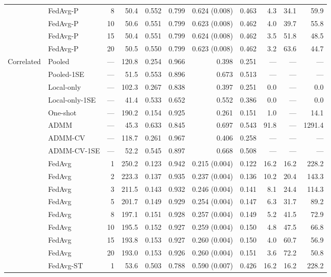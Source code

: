 \begin{longtable}{llrrrrrrrrr}
 & FedAvg-P & 8 & 50.4 & 0.552 & 0.799 & 0.624 (0.008) & 0.463 & 4.3 & 34.1 & 59.9 \\
 & FedAvg-P & 10 & 50.6 & 0.551 & 0.799 & 0.623 (0.008) & 0.462 & 4.0 & 39.7 & 55.8 \\
 & FedAvg-P & 15 & 50.4 & 0.551 & 0.799 & 0.624 (0.008) & 0.462 & 3.5 & 51.8 & 48.5 \\
 & FedAvg-P & 20 & 50.5 & 0.550 & 0.799 & 0.623 (0.008) & 0.462 & 3.2 & 63.6 & 44.7 \\
\midrule
Correlated & Pooled & --- & 120.8 & 0.254 & 0.966 & 0.398 & 0.251 & --- & --- & --- \\
 & Pooled-1SE & --- & 51.5 & 0.553 & 0.896 & 0.673 & 0.513 & --- & --- & --- \\
 & Local-only & --- & 102.3 & 0.267 & 0.838 & 0.397 & 0.251 & 0.0 & --- & 0.0 \\
 & Local-only-1SE & --- & 41.4 & 0.533 & 0.652 & 0.552 & 0.386 & 0.0 & --- & 0.0 \\
 & One-shot & --- & 190.2 & 0.154 & 0.925 & 0.261 & 0.151 & 1.0 & --- & 14.1 \\
 & ADMM & --- & 45.3 & 0.633 & 0.845 & 0.697 & 0.543 & 91.8 & --- & 1291.4 \\
 & ADMM-CV & --- & 118.7 & 0.261 & 0.967 & 0.406 & 0.258 & --- & --- & --- \\
 & ADMM-CV-1SE & --- & 52.2 & 0.545 & 0.897 & 0.668 & 0.508 & --- & --- & --- \\
 & FedAvg & 1 & 250.2 & 0.123 & 0.942 & 0.215 (0.004) & 0.122 & 16.2 & 16.2 & 228.2 \\
 & FedAvg & 2 & 223.3 & 0.137 & 0.935 & 0.237 (0.004) & 0.136 & 10.2 & 20.4 & 143.3 \\
 & FedAvg & 3 & 211.5 & 0.143 & 0.932 & 0.246 (0.004) & 0.141 & 8.1 & 24.4 & 114.3 \\
 & FedAvg & 5 & 201.7 & 0.149 & 0.929 & 0.254 (0.004) & 0.147 & 6.3 & 31.7 & 89.2 \\
 & FedAvg & 8 & 197.1 & 0.151 & 0.928 & 0.257 (0.004) & 0.149 & 5.2 & 41.5 & 72.9 \\
 & FedAvg & 10 & 195.5 & 0.152 & 0.927 & 0.259 (0.004) & 0.150 & 4.8 & 47.5 & 66.8 \\
 & FedAvg & 15 & 193.8 & 0.153 & 0.927 & 0.260 (0.004) & 0.150 & 4.0 & 60.7 & 56.9 \\
 & FedAvg & 20 & 193.0 & 0.153 & 0.926 & 0.260 (0.004) & 0.151 & 3.6 & 72.2 & 50.8 \\
 & FedAvg-ST & 1 & 53.6 & 0.503 & 0.788 & 0.590 (0.007) & 0.426 & 16.2 & 16.2 & 228.2 \\

\end{longtable}
